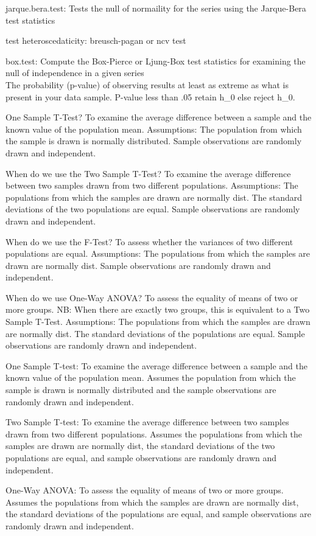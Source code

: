 \documentclass[]{book}
\begin{document}
jarque.bera.test: Tests the null of normaility for the series using the Jarque-Bera test statistics

test heteroscedaticity: breusch-pagan or ncv test

box.test: Compute the Box-Pierce or Ljung-Box test statistics for examining the null of independence in a given series\\
The probability (p-value) of observing results at least as extreme as what is present in your data sample. P-value less than .05 retain h\_0 else reject h\_0.

One Sample T-Test? To examine the average difference between a sample and the known value of the population mean. Assumptions: The population from which the sample is drawn is normally distributed. Sample observations are randomly drawn and independent.

When do we use the Two Sample T-Test? To examine the average difference between two samples drawn from two different populations. Assumptions: The populations from which the samples are drawn are normally dist. The standard deviations of the two populations are equal. Sample observations are randomly drawn and independent.

When do we use the F-Test? To assess whether the variances of two different populations are equal. Assumptions: The populations from which the samples are drawn are normally dist. Sample observations are randomly drawn and independent.

When do we use One-Way ANOVA? To assess the equality of means of two or more groups. NB: When there are exactly two groups, this is equivalent to a Two Sample T-Test. Assumptions: The populations from which the samples are drawn are normally dist. The standard deviations of the populations are equal. Sample observations are randomly drawn and independent.

One Sample T-test: To examine the average difference between a sample and the known value
of the population mean. Assumes the population from which the sample is drawn is normally distributed and the sample observations are randomly drawn and independent.

Two Sample T-test: To examine the average difference between two samples drawn from two
different populations. Assumes the populations from which the samples are drawn are normally dist, the standard deviations of the two populations are equal, and sample observations are randomly drawn and independent.

One-Way ANOVA: To assess the equality of means of two or more groups. Assumes the populations from which the samples are drawn are normally dist, the standard deviations of the populations are equal, and sample observations are randomly drawn and independent.
\end{document}
